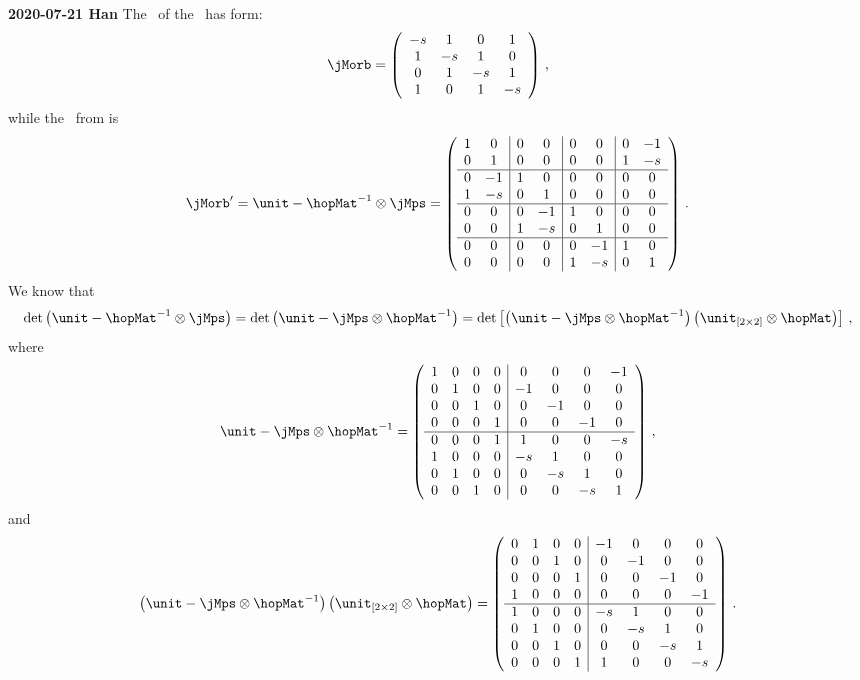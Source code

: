 {\bf 2020-07-21 Han}
The \jacobianOrb\ of the \templatt\ has form:
\[
\jMorb
=
\left(
\begin{array}{cccc}
 -s & 1 & 0 & 1 \\
 1 & -s & 1 & 0 \\
 0 & 1 & -s & 1 \\
 1 & 0 & 1 & -s \\
\end{array}
\right)
\, ,
\]
while the \jacobianOrb\ from  is
\[
\jMorb'=\unit- \hopMat^{-1} \otimes \jMps
=
\left(
\begin{array}{cc|cc|cc|cc}
 1 & 0 & 0 & 0 & 0 & 0 & 0 & -1 \\
 0 & 1 & 0 & 0 & 0 & 0 & 1 & -s \\ \hline
 0 & -1 & 1 & 0 & 0 & 0 & 0 & 0 \\
 1 & -s & 0 & 1 & 0 & 0 & 0 & 0 \\ \hline
 0 & 0 & 0 & -1 & 1 & 0 & 0 & 0 \\
 0 & 0 & 1 & -s & 0 & 1 & 0 & 0 \\ \hline
 0 & 0 & 0 & 0 & 0 & -1 & 1 & 0 \\
 0 & 0 & 0 & 0 & 1 & -s & 0 & 1 \\
\end{array}
\right)
\, .
\]
We know that
\[
\det \left( \unit- \hopMat^{-1} \otimes \jMps \right)
=
\det \left( \unit-\jMps \otimes \hopMat^{-1} \right)
=
\det \left[\left( \unit-\jMps \otimes \hopMat^{-1} \right) \left( \unit_{[2\times 2]} \otimes \hopMat \right)\right]
\, ,
\]
where
\[
\unit-\jMps \otimes \hopMat^{-1}
=
\left(
\begin{array}{cccc|cccc}
 1 & 0 & 0 & 0 & 0 & 0 & 0 & -1 \\
 0 & 1 & 0 & 0 & -1 & 0 & 0 & 0 \\
 0 & 0 & 1 & 0 & 0 & -1 & 0 & 0 \\
 0 & 0 & 0 & 1 & 0 & 0 & -1 & 0 \\ \hline
 0 & 0 & 0 & 1 & 1 & 0 & 0 & -s \\
 1 & 0 & 0 & 0 & -s & 1 & 0 & 0 \\
 0 & 1 & 0 & 0 & 0 & -s & 1 & 0 \\
 0 & 0 & 1 & 0 & 0 & 0 & -s & 1 \\
\end{array}
\right)
\, ,
\]
and
\[
\left( \unit-\jMps \otimes \hopMat^{-1} \right) \left( \unit_{[2\times 2]} \otimes \hopMat \right)
=
\left(
\begin{array}{cccc|cccc}
 0 & 1 & 0 & 0 & -1 & 0 & 0 & 0 \\
 0 & 0 & 1 & 0 & 0 & -1 & 0 & 0 \\
 0 & 0 & 0 & 1 & 0 & 0 & -1 & 0 \\
 1 & 0 & 0 & 0 & 0 & 0 & 0 & -1 \\ \hline
 1 & 0 & 0 & 0 & -s & 1 & 0 & 0 \\
 0 & 1 & 0 & 0 & 0 & -s & 1 & 0 \\
 0 & 0 & 1 & 0 & 0 & 0 & -s & 1 \\
 0 & 0 & 0 & 1 & 1 & 0 & 0 & -s \\
\end{array}
\right)
\,.
\]
